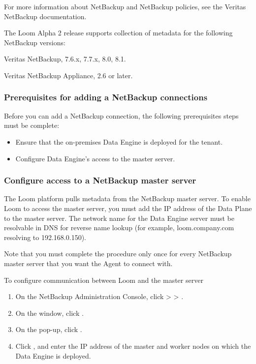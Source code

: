 \documentclass[letterpaper,10pt,english]{sphinxmanual}
\begin{document}
For more information about NetBackup and NetBackup policies, see the Veritas NetBackup documentation.

The Loom Alpha 2 release supports collection of metadata for the following NetBackup versions:

Veritas NetBackup, 7.6.x, 7.7.x, 8.0, 8.1.

Veritas NetBackup Appliance, 2.6 or later.


\subsubsection{Prerequisites for adding a NetBackup connections}
\label{\detokenize{mcdmp_app_ug:prerequisites-for-adding-a-netbackup-connections}}
Before you can add a NetBackup connection, the following prerequisites steps must be complete:
\begin{itemize}
\item {} 
Ensure that the on-premises Data Engine is deployed for the tenant.

\item {} 
Configure Data Engine’s access to the master server.

\end{itemize}


\subsubsection{Configure access to a NetBackup master server}
\label{\detokenize{mcdmp_app_ug:configure-access-to-a-netbackup-master-server}}
The Loom platform pulls metadata from the NetBackup master server. To enable Loom to access the master server, you must add the IP address of the Data Plane to the master server. The network name for the Data Engine server must be resolvable in DNS for reverse name lookup (for example, loom.company.com resolving to 192.168.0.150).

Note that you must complete the procedure only once for every NetBackup master server that you want the Agent to connect with.

To configure communication between Loom and the master server
\begin{enumerate}
\item {} 
On the NetBackup Administration Console, click  \textgreater{}  \textgreater{} .

\item {} 
On the  window, click .

\item {} 
On the  pop-up, click .

\item {} 
Click , and enter the IP address of the master and worker nodes on which the Data Engine is deployed.

\end{enumerate}
\end{document}
